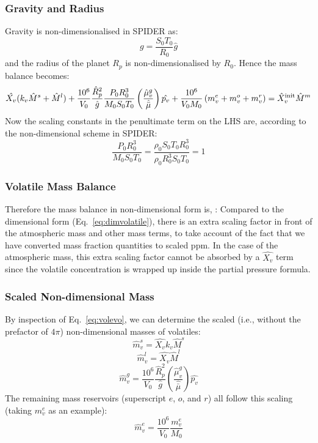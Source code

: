 \subsubsection{Gravity and Radius}
Gravity is non-dimensionalised in SPIDER as:
\begin{equation}
g = \frac{S_0 T_0}{R_0} \hat{g}
\end{equation}
and the radius of the planet $R_p$ is non-dimensionalised by $R_0$.  Hence the mass balance becomes:
\begin{equation}
\hat{X_v} (k_v \hat{M}^s + \hat{M}^l) + \frac{10^6}{V_0}\frac{\hat{R}_p^2}{\hat{g}}\frac{P_0 R_0^3}{M_0 S_0 T_0} \left( \frac{\hat{\mu}_v^g}{\hat{\bar{\mu}}} \right) \hat{p_v} + \frac{10^6}{V_0 M_0} \left( m_v^e + m_v^o + m_v^r \right) = \hat{X}_v^{\rm init} \hat{M}^m
\end{equation}
Now the scaling constants in the penultimate term on the LHS are, according to the non-dimensional scheme in SPIDER:
\begin{equation}
\frac{P_0 R_0^3}{M_0 S_0 T_0} = \frac{\rho_0 S_0 T_0 R_0^3}{\rho_0 R_0^3 S_0 T_0} = 1
\end{equation}
\subsubsection{Volatile Mass Balance}
Therefore the mass balance in non-dimensional form is, :
Compared to the dimensional form (Eq.~\ref{eq:dimvolatile}), there is an extra scaling factor in front of the atmospheric mass and other mass terms, to take account of the fact that we have converted mass fraction quantities to scaled ppm.  In the case of the atmospheric mass, this extra scaling factor cannot be absorbed by a $\hat{X_v}$ term since the volatile concentration is wrapped up inside the partial pressure formula.
\subsubsection{Scaled Non-dimensional Mass}
By inspection of Eq.~\ref{eq:volevo}, we can determine the scaled (i.e., without the prefactor of $4\pi$) non-dimensional masses of volatiles:
\begin{equation}
\hat{m}_v^s = \hat{X_v} k_v \hat{M}^s
\end{equation}
\begin{equation}
\hat{m}_v^l = \hat{X_v} \hat{M}^l
\end{equation}
\begin{equation}
\hat{m}_v^g = \frac{10^6}{V_0} \frac{\hat{R}_p^2}{\hat{g}} \left( \frac{\hat{\mu}_v^g}{\hat{\bar{\mu}}} \right) \hat{p_v}
\end{equation}
The remaining mass reservoirs (superscript $e$, $o$, and $r$) all follow this scaling (taking $m_v^e$ as an example):
\begin{equation}
\hat{m}_v^e = \frac{10^6}{V_0} \frac{m_v^e}{M_0}
\end{equation}
